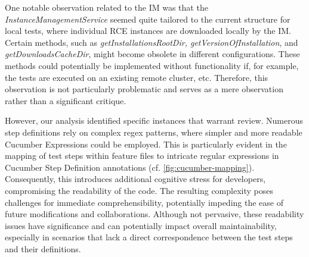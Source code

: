 One notable observation related to the \ac{IM} was that the \textit{InstanceManagementService} seemed quite tailored to the current structure for local tests, where individual \ac{RCE} instances are downloaded locally by the \ac{IM}. Certain methods, such as \textit{getInstallationsRootDir, getVersionOfInstallation}, and \textit{getDownloadsCacheDir}, might become obsolete in different configurations. These methods could potentially be implemented without functionality if, for example, the tests are executed on an existing remote cluster, etc. Therefore, this observation is not particularly problematic and serves as a mere observation rather than a significant critique.

However, our analysis identified specific instances that warrant review. Numerous step definitions rely on complex regex patterns, where simpler and more readable Cucumber Expressions could be employed. This is particularly evident in the mapping of test steps within feature files to intricate regular expressions in Cucumber Step Definition annotations (cf. \cref{fig:cucumber-mapping}). Consequently, this introduces additional cognitive stress for developers, compromising the readability of the code. The resulting complexity poses challenges for immediate comprehensibility, potentially impeding the ease of future modifications and collaborations. Although not pervasive, these readability issues have significance and can potentially impact overall maintainability, especially in scenarios that lack a direct correspondence between the test steps and their definitions.